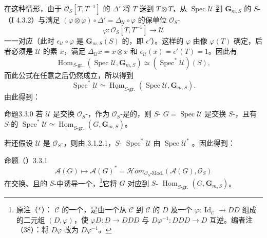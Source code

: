 在这种情形，由于 $\mathcal O_S[T,T^{-1}]$ 的 $\Delta'$ 将 $T$ 送到 $T\otimes T$，从 $\operatorname{Spec}\mathcal U$ 到 $\mathbf G_{m,S}$ 的 $S$-（I 4.3.2）与满足 $(\varphi\otimes\varphi)\circ\Delta'=\Delta_{\mathcal U}\circ\varphi$ 的保单位 $\mathcal O_S$-
\[
\varphi:\mathcal O_S[T,T^{-1}]\longrightarrow\mathcal U
\]
一一对应（此时 $\epsilon_{\mathcal U}\circ\varphi$ 是 $\mathbf G_{m,S}(S)$ 的，即 $\epsilon'$）。这样的 $\varphi$ 由像 $\varphi(T)$ 确定，后者必须是 $\mathcal U$ 的素 $x$，满足 $\Delta_{\mathcal U}x=x\otimes x$ 和 $\epsilon_{\mathcal U}(x)=\epsilon'(T)=1$。因此有
\[
\operatorname{Hom}_{S\text{-gr.}}(\operatorname{Spec}\mathcal U,\mathbf G_{m,S})\simeq(\operatorname{Spec}^*\mathcal U)(S),
\]
而此公式在任意之后仍然成立，所以得到
\[
\operatorname{Spec}^*\mathcal U\simeq\underline{\operatorname{Hom}}_{S\text{-gr.}}(\operatorname{Spec}\mathcal U,\mathbf G_{m,S}).
\]
由此得到：
\begin{SGAresult}{命题}{3.3.0}
若 $\mathcal U$ 是交换 $\mathcal O_S$-，作为 $\mathcal O_S$-是的，则 $S$- $G=\operatorname{Spec}\mathcal U$ 是交换 $S$-，且有 $S$-的
$\operatorname{Spec}^*\mathcal U\simeq\underline{\operatorname{Hom}}_{S\text{-gr.}}(G,\mathbf G_{m,S})$。
\end{SGAresult}
若还假设 $\mathcal U$ 是 $\mathcal O_S$-，则由 3.1.2.1，$S$- $\operatorname{Spec}^*\mathcal U$ 由 $\operatorname{Spec}\mathcal U^*$ 。因此得到：
\begin{SGAresult}{命题（）}{3.3.1}
\[
\mathcal A(G)\longmapsto\mathcal A(G)^*=\mathcal Hom_{\mathcal O_S\text{-}\mathrm{Mod.}}(\mathcal A(G),\mathcal O_S)
\]
在交换、且的 $S$-中诱导一个，\footnote{原注（*）： $\mathscr C$ 的一个，是由一个从 $\mathscr C$ 到 $\mathscr C$ 的 $D$ 及一个 $\varphi:\operatorname{Id}_{\mathscr C}\to DD$ 组成的二元组 $(D,\varphi)$，使 $\varphi D:D\to DDD$ 与 $D\varphi^{-1}:DDD\to D$ 互逆。编者注（38）：将 $D\varphi$ 改为 $D\varphi^{-1}$。}它将 $G$ 对应到 $S$- $\underline{\operatorname{Hom}}_{S\text{-gr.}}(G,\mathbf G_{m,S})$。
\end{SGAresult}

